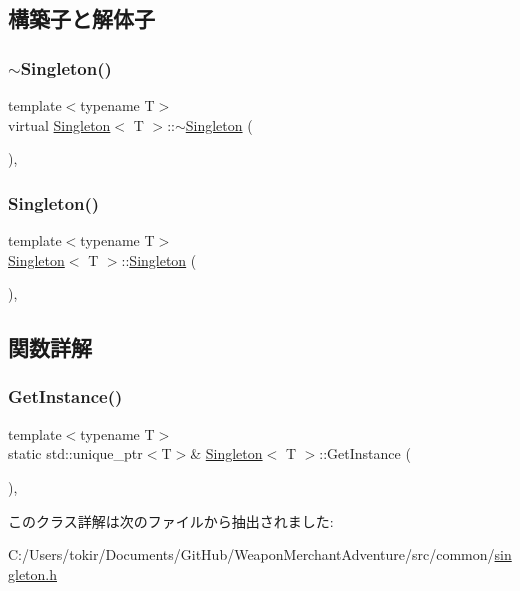 \subsection{構築子と解体子}
\mbox{\label{class_singleton_ad3c93143836479fb3dd96b21b795938c}} 
\subsubsection{\texorpdfstring{$\sim$\+Singleton()}{~Singleton()}}
{\footnotesize\ttfamily template$<$typename T$>$ \\
virtual \mbox{\hyperlink{class_singleton}{Singleton}}$<$ T $>$\+::$\sim$\mbox{\hyperlink{class_singleton}{Singleton}} (\begin{DoxyParamCaption}{ }\end{DoxyParamCaption})\hspace{0.3cm}{\ttfamily [inline]}, {\ttfamily [virtual]}}

\mbox{\label{class_singleton_a923b995920da9c06590adb170ab2f890}} 
\subsubsection{\texorpdfstring{Singleton()}{Singleton()}}
{\footnotesize\ttfamily template$<$typename T$>$ \\
\mbox{\hyperlink{class_singleton}{Singleton}}$<$ T $>$\+::\mbox{\hyperlink{class_singleton}{Singleton}} (\begin{DoxyParamCaption}{ }\end{DoxyParamCaption})\hspace{0.3cm}{\ttfamily [inline]}, {\ttfamily [protected]}}



\subsection{関数詳解}
\mbox{\label{class_singleton_a57b10e4aa6d89bbac3a16355914655b3}} 
\subsubsection{\texorpdfstring{Get\+Instance()}{GetInstance()}}
{\footnotesize\ttfamily template$<$typename T$>$ \\
static std\+::unique\+\_\+ptr$<$T$>$\& \mbox{\hyperlink{class_singleton}{Singleton}}$<$ T $>$\+::Get\+Instance (\begin{DoxyParamCaption}{ }\end{DoxyParamCaption})\hspace{0.3cm}{\ttfamily [inline]}, {\ttfamily [static]}}



このクラス詳解は次のファイルから抽出されました\+:\begin{DoxyCompactItemize}
\item 
C\+:/\+Users/tokir/\+Documents/\+Git\+Hub/\+Weapon\+Merchant\+Adventure/src/common/\mbox{\hyperlink{singleton_8h}{singleton.\+h}}\end{DoxyCompactItemize}
